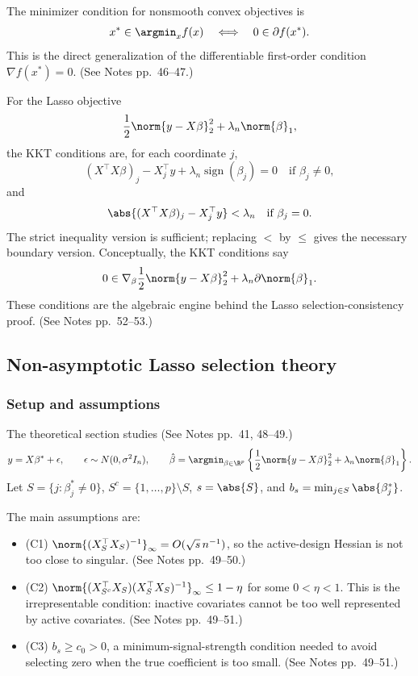 The minimizer condition for nonsmooth convex objectives is
\[
x^*\in\argmin_x f(x)
\quad\Longleftrightarrow\quad
0\in\partial f(x^*).
\]
This is the direct generalization of the differentiable first-order condition $\nabla f(x^*)=0$. (See Notes pp.~46--47.)

For the Lasso objective
\[
\frac12\norm{y-X\beta}_2^2+\lambda_n\norm{\beta}_1,
\]
the KKT conditions are, for each coordinate $j$,
\[
(X^\top X\beta)_j-X_j^\top y+\lambda_n\operatorname{sign}(\beta_j)=0
\quad \text{if }\beta_j\ne0,
\]
and
\[
\abs{(X^\top X\beta)_j-X_j^\top y}<\lambda_n
\quad \text{if }\beta_j=0.
\]
The strict inequality version is sufficient; replacing $<$ by $\le$ gives the necessary boundary version. Conceptually, the KKT conditions say
\[
0\in \nabla_\beta \frac12\norm{y-X\beta}_2^2+\lambda_n\partial\norm{\beta}_1.
\]
These conditions are the algebraic engine behind the Lasso selection-consistency proof. (See Notes pp.~52--53.)

\subsection{Non-asymptotic Lasso selection theory}
\subsubsection{Setup and assumptions}
The theoretical section studies (See Notes pp.~41, 48--49.)
\[
y=X\beta^*+\epsilon,
\qquad
\epsilon\sim N(0,\sigma^2I_n),
\qquad
\hat\beta
=\argmin_{\beta\in\R^p}
\left\{\frac12\norm{y-X\beta}_2^2+\lambda_n\norm{\beta}_1\right\}.
\]
Let $S=\{j:\beta_j^*\ne0\}$, $S^c=\{1,\ldots,p\}\setminus S$, $s=\abs{S}$, and $b_s=\min_{j\in S}\abs{\beta_j^*}$.

The main assumptions are:
\begin{itemize}
    \item (C1) $\norm{(X_S^\top X_S)^{-1}}_\infty=O(\sqrt{s}\,n^{-1})$, so the active-design Hessian is not too close to singular. (See Notes pp.~49--50.)
    \item (C2) $\norm{(X_{S^c}^\top X_S)(X_S^\top X_S)^{-1}}_\infty\le 1-\eta$ for some $0<\eta<1$. This is the irrepresentable condition: inactive covariates cannot be too well represented by active covariates. (See Notes pp.~49--51.)
    \item (C3) $b_s\ge c_0>0$, a minimum-signal-strength condition needed to avoid selecting zero when the true coefficient is too small. (See Notes pp.~49--51.)
\end{itemize}

